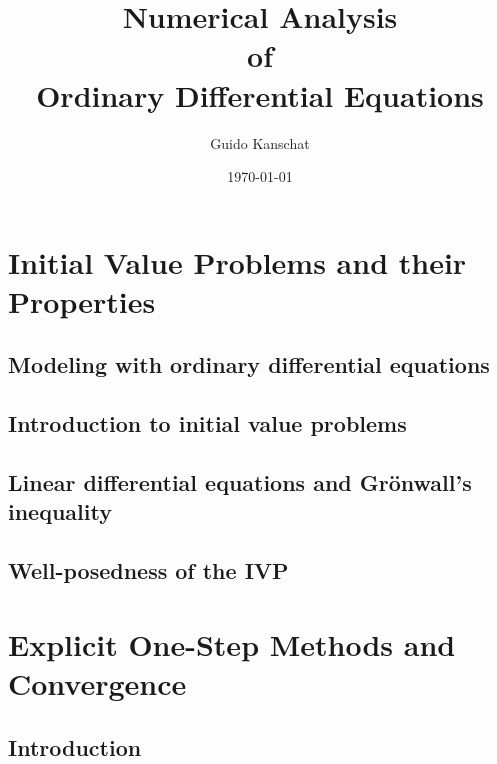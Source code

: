 \documentclass[ignorenonframetext,notheorems,aspectratio=1610]{beamer}
\title{\textbf{Numerical Analysis \\of\\
    Ordinary Differential Equations}}
\author{Guido Kanschat}
\date{\today}
\begin{document}
\frame{\maketitle}
\section{Initial Value Problems and their Properties}
\subsection{Modeling with ordinary differential equations}
\subsection{Introduction to initial value problems}

\frame{}
\frame{}
\frame{}
\frame{}
\frame{}
\frame{}

\subsection{Linear differential equations
  and Grönwall's inequality}

\frame{}
\frame{
}
\frame{}

\subsection{Well-posedness of the IVP}

\frame{}
\frame{}
\frame{}

\section{Explicit One-Step Methods and Convergence}
\subsection{Introduction}
\end{document}
